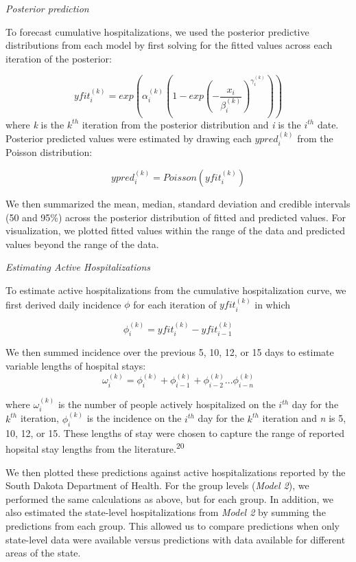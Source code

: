\documentclass[
]{article}
\begin{document}
\emph{Posterior prediction}

To forecast cumulative hospitalizations, we used the posterior predictive distributions from each model by first solving for the fitted values across each iteration of the posterior:

\[yfit_i^{(k)} = exp\left(\alpha_i^{(k)}\left(1 - exp\left(-\frac{x_i}{\beta_i^{(k)}}\right)^{\gamma_i^{(k)}}\right)\right)\]
where \emph{k} is the \(k^{th}\) iteration from the posterior distribution and \emph{i} is the \(i^{th}\) date. Posterior predicted values were estimated by drawing each \(ypred_i^{(k)}\) from the Poisson distribution:

\[ypred_i^{(k)} = Poisson(yfit_i^{(k)})\]

We then summarized the mean, median, standard deviation and credible intervals (50 and 95\%) across the posterior distribution of fitted and predicted values. For visualization, we plotted fitted values within the range of the data and predicted values beyond the range of the data.

\emph{Estimating Active Hospitalizations}

To estimate active hospitalizations from the cumulative hospitalization curve, we first derived daily incidence \(\phi\) for each iteration of \(yfit_i^{(k)}\) in which

\[\phi_{i}^{(k)} = yfit_i^{(k)} - yfit_{i-1}^{(k)}\]

We then summed incidence over the previous 5, 10, 12, or 15 days to estimate variable lengths of hospital stays:
\[\omega_i^{(k)} = \phi_i^{(k)} + \phi_{i-1}^{(k)} + \phi_{i-2}^{(k)}...\phi_{i-n}^{(k)}\]

where \(\omega_i^{(k)}\) is the number of people actively hospitalized on the \(i^{th}\) day for the \(k^{th}\) iteration, \(\phi_i^{(k)}\) is the incidence on the \(i^{th}\) day for the \(k^{th}\) iteration and \emph{n} is 5, 10, 12, or 15. These lengths of stay were chosen to capture the range of reported hopsital stay lengths from the literature.\textsuperscript{20}

We then plotted these predictions against active hospitalizations reported by the South Dakota Department of Health. For the group levels (\emph{Model 2}), we performed the same calculations as above, but for each group. In addition, we also estimated the state-level hospitalizations from \emph{Model 2} by summing the predictions from each group. This allowed us to compare predictions when only state-level data were available versus predictions with data available for different areas of the state.
\end{document}
